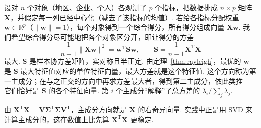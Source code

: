 \documentclass[lang=cn,10.5pt,scheme=chinese,toc=twocol,section,chinesefont=nofont,
twoside,citestyle=gb7714-2015,bibstyle=gb7714-2015]{elegantbook}
\DeclareRobustCommand{\textbf}[1]{{\lnsemiboldlatin\lnsemiboldcjk #1}}
\newcommand{\vv}[1]{\boldsymbol{#1}}
\newcommand{\trans}{\mathrm{T}}             %
\numberwithin{equation}{section}   %
\begin{document}
设对 $n$ 个对象（地区、企业、个人）各观测了 $p$ 个指标，把数据排成 $n\times p$ 矩阵 $\vv X$，并假定每一列已经\textbf{中心化}（减去了该指标的均值）. 若给各指标分配权重 $\vv w\in\mathbb{R}^p$（$\|\vv w\|=1$），每个对象得到一个综合得分，所有得分组成向量 $\vv X\vv w$. 我们希望综合得分\textbf{尽可能地把各个对象区分开}，即让得分的方差
\[\frac1{n-1}\|\vv X\vv w\|^2=\vv w^\trans\vv S\vv w,\qquad \vv S=\frac1{n-1}\vv X^\trans\vv X\]
最大. $\vv S$ 是\textbf{样本协方差矩阵}，实对称且半正定. 由定理~\ref{thm:rayleigh}，最优的 $\vv w$ 是 $\vv S$ 最大特征值对应的单位特征向量，最大方差就是这个特征值. 这个方向称为\textbf{第一主成分}；在与之正交的方向中再求方差最大者，得到第二主成分，依此类推——它们恰好是 $\vv S$ 的各个特征向量. 第 $i$ 个主成分“解释”了总方差的 $\lambda_i/\sum_j\lambda_j$.

由 $\vv X^\trans\vv X=\vv V\vv\Sigma^\trans\vv\Sigma\vv V^\trans$，主成分方向就是 $\vv X$ 的右奇异向量. 实践中正是用 SVD 来计算主成分的，这在数值上比先算 $\vv X^\trans\vv X$ 更稳定.
\end{document}
